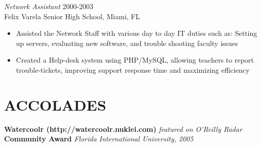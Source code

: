 \documentclass[margin]{res}
\begin{document}
\begin{resume}
  {\sl Network Assistant} \hfill        2000-2003 \\
  Felix Varela Senior High School, Miami, FL
  \begin{itemize}  \itemsep -2pt %
    \item Assisted the Network Staff with various day to day IT duties such as:
      Setting up servers, evaluating new software, and trouble shooting faculty issues
    \item Created a Help-desk system using PHP/MySQL, allowing teachers to
      report trouble-tickets, improving support response time and maximizing
      efficiency
  \end{itemize} 

  \section{ACCOLADES}
  {\bf Watercoolr (http://watercoolr.nuklei.com) }{\it featured on O'Reilly Radar} \\
  {\bf Community Award }{\it Florida International University, 2005}


\end{resume}
\end{document}
